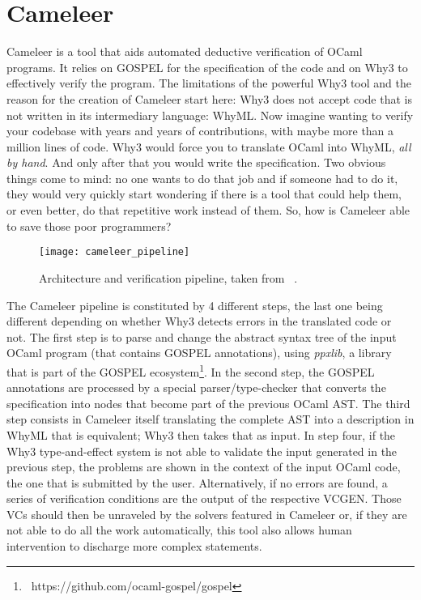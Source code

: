 \section{Cameleer}
\label{sec:cameleer}

Cameleer is a tool that aids automated deductive verification of OCaml programs.
It relies on GOSPEL for the specification of the code and on Why3 to effectively verify the program.
The limitations of the powerful Why3 tool and the reason for the creation of Cameleer start here: Why3 does not accept code that is not written in its intermediary language: WhyML.
Now imagine wanting to verify your codebase with years and years of contributions, with maybe more than a million lines of code.
Why3 would force you to translate OCaml into WhyML, \emph{all by hand}. 
And only after that you would write the specification.
Two obvious things come to mind: no one wants to do that job and if someone had to do it, they would very quickly start wondering if there is a tool that could help them, or even better, do that repetitive work instead of them.
So, how is Cameleer able to save those poor programmers?

\begin{figure}[htbp]
  \centering
  \texttt{[image: cameleer\_pipeline]}
  \caption{Architecture and verification pipeline, taken from ~\cite{DBLP:conf/cav/PereiraR20}.}
  \label{fig:cameleer_pipeline}
\end{figure}

The Cameleer pipeline is constituted by 4 different steps, the last one being different depending on whether Why3 detects errors in the translated code or not.
The first step is to parse and change the abstract syntax tree of the input OCaml program (that contains GOSPEL annotations), using \emph{ppxlib}, a library that is part of the GOSPEL ecosystem\protect\footnote{\ https://github.com/ocaml-gospel/gospel}.
In the second step, the GOSPEL annotations are processed by a special parser/type-checker that converts the specification into nodes that become part of the previous OCaml AST.
The third step consists in Cameleer itself translating the complete AST into a description in WhyML that is equivalent; Why3 then takes that as input.
In step four, if the Why3 type-and-effect system is not able to validate the input generated in the previous step, the problems are shown in the context of the input OCaml code, the one that is submitted by the user. 
Alternatively, if no errors are found, a series of verification conditions are the output of the respective VCGEN.
Those VCs should then be unraveled by the solvers featured in Cameleer or, if they are not able to do all the work automatically, this tool also allows human intervention to discharge more complex statements.

